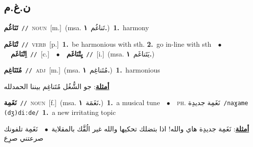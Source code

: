 \documentclass[10pt,a4paper,twoside]{article} %
\begin{document}
\begin{multicols}{2}
\vspace{-3mm}
\subsection*{\color{blue}\foreignlanguage{arabic}{ن.غ.م}\color{blue}{}} 

{\setlength\topsep{0pt}\textbf{\foreignlanguage{arabic}{تَنَاغُم}}\ {\color{gray}\texttt{//}\color{black}}\ \textsc{noun}\ [m.]\ \color{gray}(msa. \foreignlanguage{arabic}{تَناغُم}~\foreignlanguage{arabic}{\textbf{١.}})\color{black}\ \textbf{1.}~harmony\ } \vspace{2mm}

{\setlength\topsep{0pt}\textbf{\foreignlanguage{arabic}{تْنَاغَم}}\ {\color{gray}\texttt{//}\color{black}}\ \textsc{verb}\ [p.]\ \textbf{1.}~be harmonious with sth.  \textbf{2.}~go in-line with sth\ \ $\bullet$\ \ \setlength\topsep{0pt}\textbf{\foreignlanguage{arabic}{اِتْنَاغَم}}\ {\color{gray}\texttt{//}\color{black}}\ [c.]\ \ $\bullet$\ \ \setlength\topsep{0pt}\textbf{\foreignlanguage{arabic}{يِتْنَاغَم}}\ {\color{gray}\texttt{//}\color{black}}\ [i.]\ \color{gray}(msa. \foreignlanguage{arabic}{يَتَناغَم}~\foreignlanguage{arabic}{\textbf{١.}})\color{black}\ } \vspace{2mm}

{\setlength\topsep{0pt}\textbf{\foreignlanguage{arabic}{مُتَنَاغِم}}\ {\color{gray}\texttt{//}\color{black}}\ \textsc{adj}\ [m.]\ \color{gray}(msa. \foreignlanguage{arabic}{مُتَناغِم}~\foreignlanguage{arabic}{\textbf{١.}})\color{black}\ \textbf{1.}~harmonious\  \begin{flushright}\color{gray}\foreignlanguage{arabic}{\textbf{\underline{\foreignlanguage{arabic}{أمثلة}}}: جو الشُّغُل مُتَناغِم بيننا الحمدلله}\end{flushright}\color{black}} \vspace{2mm}

{\setlength\topsep{0pt}\textbf{\foreignlanguage{arabic}{نَغَمِة}}\ {\color{gray}\texttt{//}\color{black}}\ \textsc{noun}\ [f.]\ \color{gray}(msa. \foreignlanguage{arabic}{نَغَمَة}~\foreignlanguage{arabic}{\textbf{١.}})\color{black}\ \textbf{1.}~a musical tune\ \ $\bullet$\ \ \textsc{ph.} \color{gray} \foreignlanguage{arabic}{نَغَمِة جديدِة}\color{black}\ {\color{gray}\texttt{/{\sffamily naɣame (dʒ)diːde}/}\color{black}}\ \textbf{1.}~a new irritating topic\  \begin{flushright}\color{gray}\foreignlanguage{arabic}{\textbf{\underline{\foreignlanguage{arabic}{أمثلة}}}: نَغَمِة جديدِة هاي والله! اذا بتضلك تحكيها والله غير الُقَّك بالمقلاية\ $\bullet$\ \  نَغَمِة تلفونك صرعتني صرِع}\end{flushright}\color{black}} \vspace{2mm}


\end{multicols}
\end{document}

